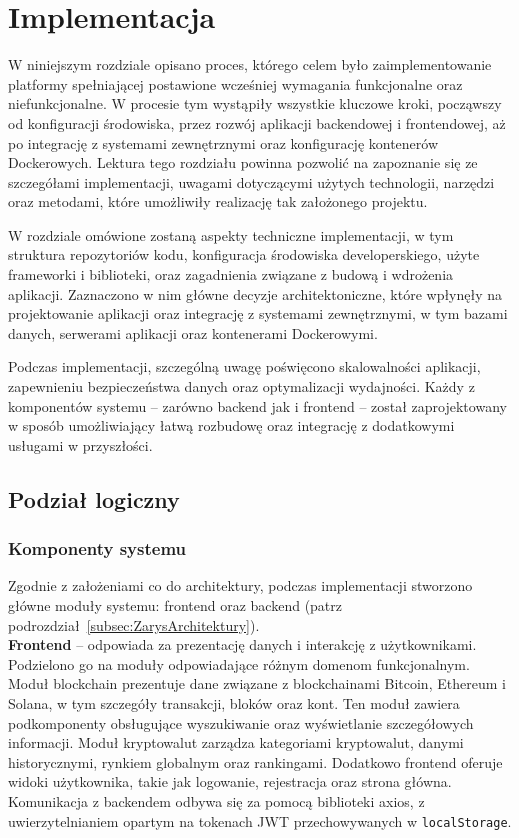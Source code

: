 \chapter{Implementacja}
W niniejszym rozdziale opisano proces, którego celem było zaimplementowanie platformy spełniającej postawione wcześniej wymagania funkcjonalne oraz niefunkcjonalne. 
W procesie tym wystąpiły wszystkie kluczowe kroki, począwszy od konfiguracji środowiska, przez rozwój aplikacji backendowej i frontendowej, aż po integrację z systemami zewnętrznymi oraz konfigurację kontenerów Dockerowych. Lektura tego rozdziału powinna pozwolić na zapoznanie się ze szczegółami implementacji, uwagami dotyczącymi użytych technologii, narzędzi oraz metodami, które umożliwiły realizację tak założonego projektu.

W rozdziale omówione zostaną aspekty techniczne implementacji, w tym struktura repozytoriów kodu, konfiguracja środowiska developerskiego, użyte frameworki i biblioteki, oraz zagadnienia związane z budową i wdrożenia aplikacji. Zaznaczono w nim główne decyzje architektoniczne, które wpłynęły na projektowanie aplikacji oraz integrację z systemami zewnętrznymi, w tym bazami danych, serwerami aplikacji oraz kontenerami Dockerowymi.

Podczas implementacji, szczególną uwagę poświęcono skalowalności aplikacji, zapewnieniu bezpieczeństwa danych oraz optymalizacji wydajności. Każdy z komponentów systemu – zarówno backend jak i frontend – został zaprojektowany w sposób umożliwiający łatwą rozbudowę oraz integrację z dodatkowymi usługami w przyszłości.


\section{Podział logiczny}
\subsection{Komponenty systemu}
Zgodnie z założeniami co do architektury, podczas implementacji stworzono główne moduły systemu: frontend oraz backend (patrz podrozdział~\ref{subsec:ZarysArchitektury}).\\[-10pt]

\noindent \textbf{Frontend} -- %
odpowiada za prezentację danych i interakcję z użytkownikami. Podzielono go na moduły odpowiadające różnym domenom funkcjonalnym. Moduł blockchain prezentuje dane związane z blockchainami Bitcoin, Ethereum i Solana, w tym szczegóły transakcji, bloków oraz kont. Ten moduł zawiera podkomponenty obsługujące wyszukiwanie oraz wyświetlanie szczegółowych informacji. Moduł kryptowalut zarządza kategoriami kryptowalut, danymi historycznymi, rynkiem globalnym oraz rankingami. Dodatkowo frontend oferuje widoki użytkownika, takie jak logowanie, rejestracja oraz strona główna. Komunikacja z backendem odbywa się za pomocą biblioteki axios, z uwierzytelnianiem opartym na tokenach JWT przechowywanych w \texttt{localStorage}.\\[-10pt]

